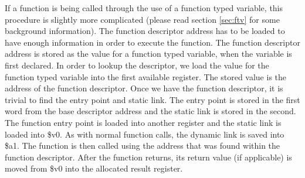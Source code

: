 \begin{description}
	If a function is being called through the use of a function typed variable, this procedure is slightly more complicated (please read section \ref{sec:ftv} for some background information). The function descriptor address has to be loaded to have enough information in order to execute the function. The function descriptor address is stored as the value for a function typed variable, when the variable is first declared. In order to lookup the descriptor, we load the value for the function typed variable into the first available register. The stored value is the address of the function descriptor. Once we have the function descriptor, it is trivial to find the entry point and static link. The entry point is stored in the first word from the base descriptor address and the static link is stored in the second. The function entry point is loaded into another register and the static link is loaded into \$v0. As with normal function calls, the dynamic link is saved into \$a1. The function is then called using the address that was found within the function descriptor. After the function returns, its return value (if applicable) is moved from \$v0 into the allocated result register.
\end{description}

